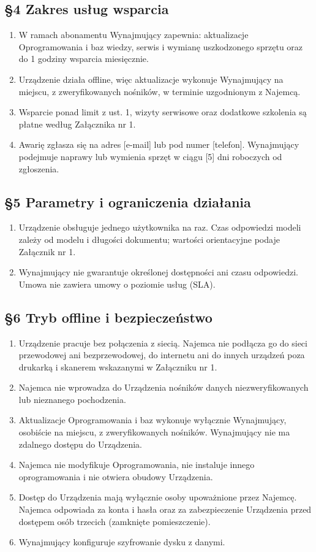 \documentclass[11pt,a4paper]{article}
\begin{document}
\subsection*{§4 Zakres usług wsparcia}
\begin{enumerate}
\item W ramach abonamentu Wynajmujący zapewnia: aktualizacje Oprogramowania i baz wiedzy, serwis i wymianę uszkodzonego sprzętu oraz do 1 godziny wsparcia miesięcznie.
\item Urządzenie działa offline, więc aktualizacje wykonuje Wynajmujący na miejscu, z zweryfikowanych nośników, w terminie uzgodnionym z Najemcą.
\item Wsparcie ponad limit z ust. 1, wizyty serwisowe oraz dodatkowe szkolenia są płatne według Załącznika nr 1.
\item Awarię zgłasza się na adres [e-mail] lub pod numer [telefon]. Wynajmujący podejmuje naprawy lub wymienia sprzęt w ciągu [5] dni roboczych od zgłoszenia.
\end{enumerate}

\subsection*{§5 Parametry i ograniczenia działania}
\begin{enumerate}
\item Urządzenie obsługuje jednego użytkownika na raz. Czas odpowiedzi modeli zależy od modelu i długości dokumentu; wartości orientacyjne podaje Załącznik nr 1.
\item Wynajmujący nie gwarantuje określonej dostępności ani czasu odpowiedzi. Umowa nie zawiera umowy o poziomie usług (SLA).
\end{enumerate}

\subsection*{§6 Tryb offline i bezpieczeństwo}
\begin{enumerate}
\item Urządzenie pracuje bez połączenia z siecią. Najemca nie podłącza go do sieci przewodowej ani bezprzewodowej, do internetu ani do innych urządzeń poza drukarką i skanerem wskazanymi w Załączniku nr 1.
\item Najemca nie wprowadza do Urządzenia nośników danych niezweryfikowanych lub nieznanego pochodzenia.
\item Aktualizacje Oprogramowania i baz wykonuje wyłącznie Wynajmujący, osobiście na miejscu, z zweryfikowanych nośników. Wynajmujący nie ma zdalnego dostępu do Urządzenia.
\item Najemca nie modyfikuje Oprogramowania, nie instaluje innego oprogramowania i nie otwiera obudowy Urządzenia.
\item Dostęp do Urządzenia mają wyłącznie osoby upoważnione przez Najemcę. Najemca odpowiada za konta i hasła oraz za zabezpieczenie Urządzenia przed dostępem osób trzecich (zamknięte pomieszczenie).
\item Wynajmujący konfiguruje szyfrowanie dysku z danymi.
\end{enumerate}
\end{document}
